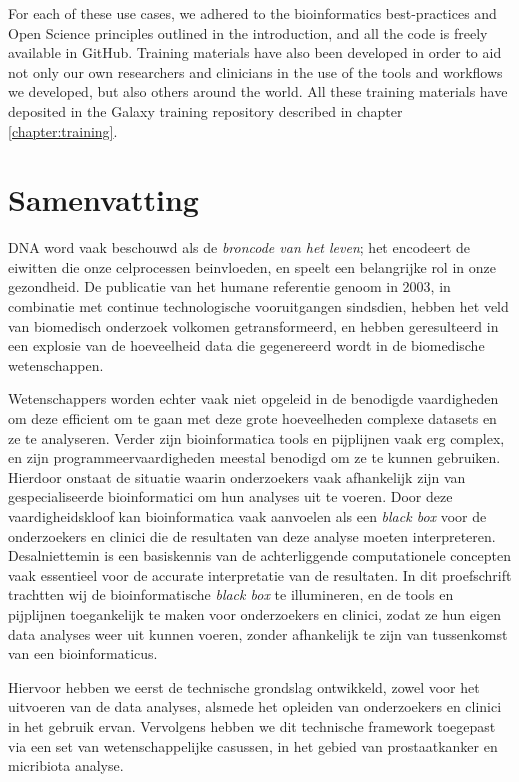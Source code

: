 For each of these use cases, we adhered to the bioinformatics best-practices and Open Science principles outlined in the introduction, and all the code is freely available in GitHub. Training materials have also been developed in order to aid not only our own researchers and clinicians in the use of the tools and workflows we developed, but also others around the world. All these training materials have deposited in the Galaxy training repository described in chapter \ref{chapter:training}.


\section{Samenvatting}

DNA word vaak beschouwd als de \emph{broncode van het leven}; het encodeert
de eiwitten die onze celprocessen beinvloeden, en speelt een belangrijke rol in onze gezondheid.
De publicatie van het humane referentie genoom in 2003, in combinatie met continue technologische vooruitgangen sindsdien, hebben het veld van biomedisch onderzoek volkomen getransformeerd, en hebben geresulteerd in een explosie van de hoeveelheid data die gegenereerd wordt in de biomedische wetenschappen.

Wetenschappers worden echter vaak niet opgeleid in de benodigde vaardigheden om deze efficient om te gaan met deze grote hoeveelheden complexe datasets en ze te analyseren.
Verder zijn bioinformatica tools en pijplijnen vaak erg complex, en zijn programmeervaardigheden meestal benodigd om ze te kunnen gebruiken. Hierdoor onstaat de situatie waarin onderzoekers vaak afhankelijk zijn van gespecialiseerde bioinformatici om hun analyses uit te voeren.
Door deze vaardigheidskloof kan bioinformatica vaak aanvoelen als een \emph{black box} voor de onderzoekers en clinici die de resultaten van deze analyse moeten interpreteren.
Desalniettemin is een basiskennis van de achterliggende computationele concepten vaak essentieel voor de accurate interpretatie van de resultaten.
In dit proefschrift trachtten wij de bioinformatische \emph{black box} te illumineren, en de tools en pijplijnen toegankelijk te maken voor onderzoekers en clinici, zodat ze hun eigen data analyses weer uit kunnen voeren, zonder afhankelijk te zijn van tussenkomst van een bioinformaticus.

Hiervoor hebben we eerst de technische grondslag ontwikkeld, zowel voor het uitvoeren van de data analyses, alsmede het opleiden van onderzoekers en clinici in het gebruik ervan. Vervolgens hebben we dit technische framework toegepast via een set van wetenschappelijke casussen, in het gebied van prostaatkanker en micribiota analyse.

